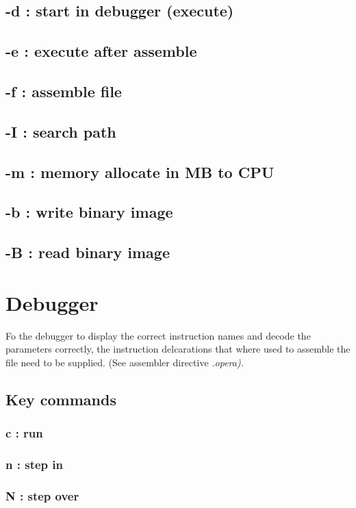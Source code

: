 \documentclass[a4paper,11pt]{article}
\begin{document}
\subsection{-d : start in debugger (execute)}
\subsection{-e : execute after assemble}
\subsection{-f : assemble file}
\subsection{-I : search path}
\subsection{-m : memory allocate in MB to CPU}
\subsection{-b : write binary image}
\subsection{-B : read binary image}

\pagebreak
\section{Debugger}
Fo the debugger to display the correct instruction names and decode the parameters correctly, the instruction delcarations that where used to assemble the file need to be supplied. (See assembler directive \sl .opera\rm).\\
\subsection{Key commands}
\subsubsection{c : run}
\subsubsection{n : step in}
\subsubsection{N : step over}
\end{document}
